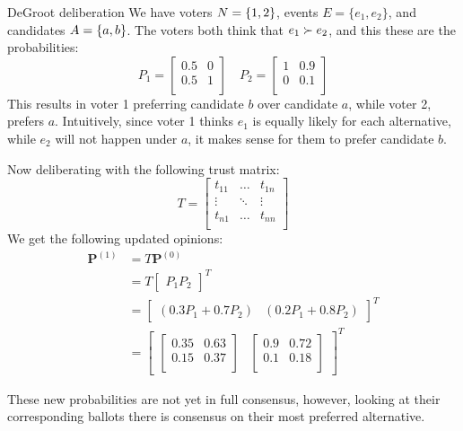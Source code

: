 \begin{example}{DeGroot deliberation}
	{}
	We have voters \(N = \{1,2\}\), events \(E = \{e_{1}, e_{2}\}\), and candidates \(A = \{a,b\}\). The voters both think that \(e_{1} \succ e_{2}\), and this these are the probabilities:
	\[
		P_1 =\begin{bmatrix}
			0.5 & 0 \\
			0.5 & 1 \\
		\end{bmatrix}\quad
		P_2 =\begin{bmatrix}
			1 & 0.9 \\
			0 & 0.1 \\
		\end{bmatrix}
	\]
	This results in voter 1 preferring candidate $b$ over candidate $a$, while voter 2, prefers $a$. Intuitively, since voter 1 thinks $e_{1}$ is equally likely for each alternative, while $e_{2}$ will not happen under $a$, it makes sense for them to prefer candidate $b$.

	Now deliberating with the following trust matrix:
	\[
		T=\begin{bmatrix}
			t_{11} & \dots  & t_{1n} \\
			\vdots & \ddots & \vdots \\
			t_{n1} & \dots  & t_{nn} \\
		\end{bmatrix}
	\]
	We get the following updated opinions:
	\begin{align*}
		\boldsymbol{P}^{(1)} & = T\boldsymbol{P}^{(0)}                                                    \\
		                     & =T\begin{bmatrix}P_1 P_2\end{bmatrix}^{T}                                  \\
		                     & =\begin{bmatrix}(0.3P_1 + 0.7P_{2}) & (0.2P_1 + 0.8P_{2})\end{bmatrix}^{T} \\
		                     & = \begin{bmatrix}
			                         \begin{bmatrix}
				0.35 & 0.63 \\
				0.15 & 0.37 \\
			\end{bmatrix} &
			                         \begin{bmatrix}
				0.9 & 0.72 \\
				0.1 & 0.18 \\
			\end{bmatrix}
		                         \end{bmatrix}^{T}
	\end{align*}

	These new probabilities are not yet in full consensus, however, looking at their corresponding ballots there is consensus on their most preferred alternative.
	\label{example:deGroot-delib}
\end{example}

